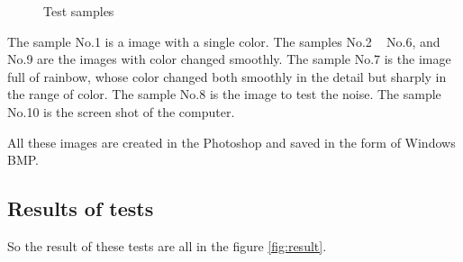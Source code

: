\documentclass{article}
\begin{document}
\begin{figure}
\caption{Test samples}
\label{fig:test}
\end{figure}

The sample No.1 is a image with a single color. The samples No.2 ~ No.6, and No.9 are the images with
color changed smoothly. The sample No.7 is the image full of rainbow, whose color changed
both smoothly in the detail but sharply in the range of color. The sample No.8 is
the image to test the noise. The sample No.10 is the screen shot of the computer.

All these images are created in the Photoshop and saved in the form of Windows BMP.

\subsection{Results of tests}
\label{sec:test:result}

So the result of these tests are all in the figure \ref{fig:result}.
\end{document}
